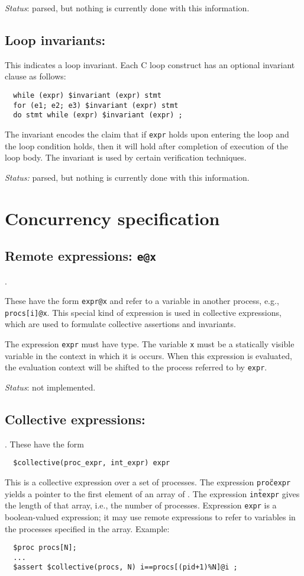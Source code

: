\emph{Status}: parsed, but nothing is currently done with this
information.

\subsection{Loop invariants: \cinvariant}

This indicates a loop invariant.  Each C loop
construct has an optional invariant clause as follows:
\begin{verbatim}
  while (expr) $invariant (expr) stmt
  for (e1; e2; e3) $invariant (expr) stmt
  do stmt while (expr) $invariant (expr) ;
\end{verbatim}
The invariant encodes the claim that if \texttt{expr} holds upon
entering the loop and the loop condition holds, then it will hold
after completion of execution of the loop body.  The invariant is used
by certain verification techniques.

\emph{Status:} parsed, but nothing is currently done with this
information.

\section{Concurrency specification}

\subsection{Remote expressions: \texttt{e@x}}.

These have the form \verb!expr@x! and refer to a variable in another
process, e.g., \verb!procs[i]@x!. This special kind of expression is
used in collective expressions, which are used to formulate collective
assertions and invariants.

The expression \verb!expr! must have \cproc{} type.  The variable
\texttt{x} must be a statically visible variable in the context in
which it is occurs.  When this expression is evaluated, the evaluation
context will be shifted to the process referred to by \texttt{expr}.

\emph{Status}: not implemented.

\subsection{Collective expressions: \ccollective}.  These have the form
\begin{verbatim}
  $collective(proc_expr, int_expr) expr 
\end{verbatim}
This is a collective expression over a set of processes.  The
expression \texttt{proc{\U}expr} yields a pointer to the first element
of an array of \cproc.  The expression \texttt{int{\U}expr} gives the
length of that array, i.e., the number of processes.  Expression
\texttt{expr} is a boolean-valued expression; it may use remote
expressions to refer to variables in the processes specified in the
array.  Example:
\begin{verbatim}
  $proc procs[N];
  ...
  $assert $collective(procs, N) i==procs[(pid+1)%N]@i ;
\end{verbatim}


